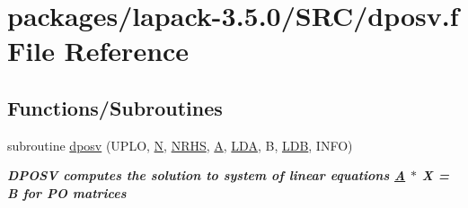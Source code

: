\hypertarget{dposv_8f}{}\section{packages/lapack-\/3.5.0/\+S\+R\+C/dposv.f File Reference}
\label{dposv_8f}
\subsection*{Functions/\+Subroutines}
\begin{DoxyCompactItemize}
\item 
subroutine \hyperlink{group__doublePOsolve_ga9ce56acceb70eb6484a768eaa841f70d}{dposv} (U\+P\+L\+O, \hyperlink{polmisc_8c_a0240ac851181b84ac374872dc5434ee4}{N}, \hyperlink{example__user_8c_aa0138da002ce2a90360df2f521eb3198}{N\+R\+H\+S}, \hyperlink{classA}{A}, \hyperlink{example__user_8c_ae946da542ce0db94dced19b2ecefd1aa}{L\+D\+A}, B, \hyperlink{example__user_8c_a50e90a7104df172b5a89a06c47fcca04}{L\+D\+B}, I\+N\+F\+O)
\begin{DoxyCompactList}\small\item\em {\bfseries  D\+P\+O\+S\+V computes the solution to system of linear equations \hyperlink{classA}{A} $\ast$ X = B for P\+O matrices} \end{DoxyCompactList}\end{DoxyCompactItemize}
